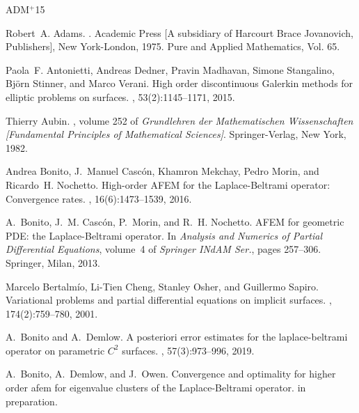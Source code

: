 \documentclass{amsart}
\begin{document}

\newcommand{\etalchar}[1]{$^{#1}$}
\begin{thebibliography}{ADM{\etalchar{+}}15}

Robert~A. Adams.
.
\newblock Academic Press [A subsidiary of Harcourt Brace Jovanovich,
  Publishers], New York-London, 1975.
\newblock Pure and Applied Mathematics, Vol. 65.

\bibitem[ADM{\etalchar{+}}15]{ADMSSV15}
Paola~F. Antonietti, Andreas Dedner, Pravin Madhavan, Simone Stangalino,
  Bj\"{o}rn Stinner, and Marco Verani.
\newblock High order discontinuous {G}alerkin methods for elliptic problems on
  surfaces.
, 53(2):1145--1171, 2015.

Thierry Aubin.
,
  volume 252 of {\em Grundlehren der Mathematischen Wissenschaften [Fundamental
  Principles of Mathematical Sciences]}.
\newblock Springer-Verlag, New York, 1982.

\bibitem[BCM{\etalchar{+}}16]{BCMMN16}
Andrea Bonito, J.~Manuel Casc{\'o}n, Khamron Mekchay, Pedro Morin, and
  Ricardo~H. Nochetto.
\newblock High-order {AFEM} for the {L}aplace-{B}eltrami operator: Convergence
  rates.
, 16(6):1473--1539, 2016.

A.~Bonito, J.~M. Casc{\'o}n, P.~Morin, and R.~H. Nochetto.
\newblock A{FEM} for geometric {PDE}: the {L}aplace-{B}eltrami operator.
\newblock In {\em Analysis and Numerics of Partial Differential Equations},
  volume~4 of {\em Springer INdAM Ser.}, pages 257--306. Springer, Milan, 2013.

Marcelo Bertalm\'{i}o, Li-Tien Cheng, Stanley Osher, and Guillermo Sapiro.
\newblock Variational problems and partial differential equations on implicit
  surfaces.
, 174(2):759--780, 2001.

A.~Bonito and A.~Demlow.
\newblock A posteriori error estimates for the laplace-beltrami operator on
  parametric {${C}^2$} surfaces.
, 57(3):973--996, 2019.

A.~Bonito, A.~Demlow, and J.~Owen.
\newblock Convergence and optimality for higher order afem for eigenvalue
  clusters of the {L}aplace-{B}eltrami operator.
\newblock in preparation.


\end{thebibliography}
\end{document}
